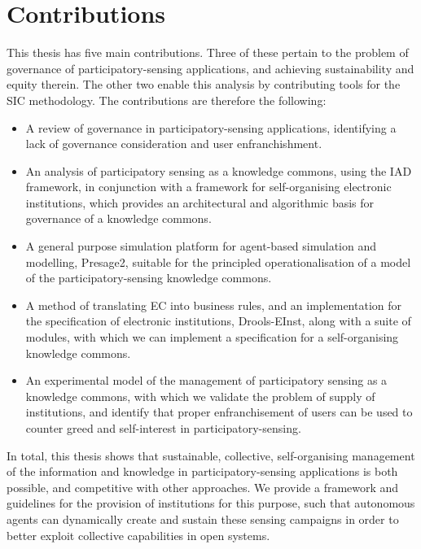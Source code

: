 \section{Contributions}

This thesis has five main contributions. Three of these pertain to the problem of governance of participatory-sensing applications, and achieving sustainability and equity therein. The other two enable this analysis by contributing tools for the \ac{SIC} methodology. The contributions are therefore the following:

\begin{itemize}
\item A review of governance in participatory-sensing applications, identifying a lack of governance consideration and user enfranchishment.
\item An analysis of participatory sensing as a knowledge commons, using the \ac{IAD} framework, in conjunction with a framework for self-organising electronic institutions, which provides an architectural and algorithmic basis for governance of a knowledge commons.
\item A general purpose simulation platform for agent-based simulation and modelling, Presage2, suitable for the principled operationalisation of a model of the participatory-sensing knowledge commons.
\item A method of translating \acl{EC} into business rules, and an implementation for the specification of electronic institutions, Drools-EInst, along with a suite of modules, with which we can implement a specification for a self-organising knowledge commons.
\item An experimental model of the management of participatory sensing as a knowledge commons, with which we validate the problem of supply of institutions, and identify that proper enfranchisement of users can be used to counter greed and self-interest in participatory-sensing.
\end{itemize}

In total, this thesis shows that sustainable, collective, self-organising
management of the information and knowledge in participatory-sensing
applications is both possible, and competitive with other approaches. We
provide a framework and guidelines for the provision of institutions for this
purpose, such that autonomous agents can dynamically create and sustain these
sensing campaigns in order to better exploit collective capabilities in open
systems.
